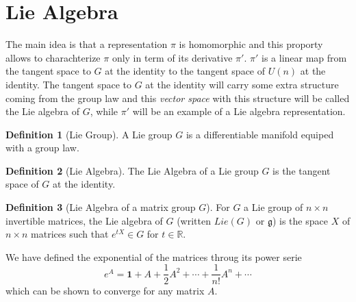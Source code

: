\documentclass[11pt,a4paper]{article}
\theoremstyle{definition}
\newtheorem{definition}{Definition}[section]
\numberwithin{equation}{section}
\begin{document}
\section{Lie Algebra}
The main idea is that a representation $\pi$ is homomorphic and this proporty allows to charachterize $\pi$ only in term of its derivative $\pi'$. $\pi'$ is a linear map from the tangent space to $G$ at the identity to the tangent space of $U(n)$ at the identity. The tangent space to $G$ at the identity will carry some extra structure coming from the group law and this \textit{vector space} with this structure will be called the Lie algebra of $G$, while $\pi'$ will be an example of a Lie algebra representation.
\begin{definition}[Lie Group] 
    A Lie group $G$ is a differentiable manifold equiped with a group law. 
\end{definition}
\begin{definition}[Lie Algebra]
    The Lie Algebra of a Lie group $G$ is the tangent space of $G$ at the identity.
\end{definition}
\begin{definition}[Lie Algebra of a matrix group $G$]
    For $G$ a Lie group of $n\times n$ invertible matrices, the Lie algebra of $G$ (written $Lie(G)$ or $\mathfrak{g}$) is the space $X$ of $n\times n$ matrices such that $e^{tX}\in G$ for $t \in \mathbb{R}$.
\end{definition}
We have defined the exponential of the matrices throug its power serie
\begin{equation}
    e^A = \mathbf{1} + A + \frac{1}{2} A^2 + \cdots + \frac{1}{n!}A^n + \cdots
\end{equation}
which can be shown to converge for any matrix $A$.
\end{document}
